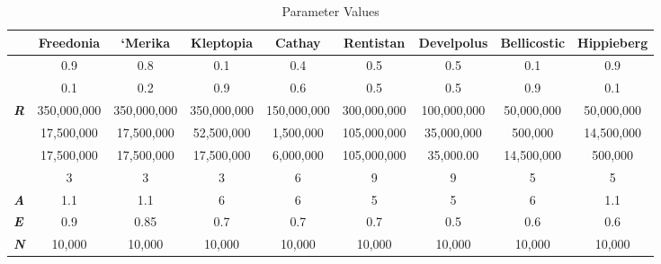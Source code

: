 \documentclass[12pt]{article}
\begin{document}
\begin{spacing}{1.5}

\begin{table}[]
\centering
\begin{tiny}
\caption{Parameter Values}
\begin{tabular}{lcccccccc}
\toprule
                    & \textbf{Freedonia} & \textbf{`Merika} & \textbf{Kleptopia} & \textbf{Cathay} & \textbf{Rentistan} & \textbf{Develpolus} & \textbf{Bellicostic} & \textbf{Hippieberg} \\ \hline
\boldmath{$\alpha$}   & 0.9              & 0.8              & 0.1                & 0.4             & 0.5                & 0.5                 & 0.1                  & 0.9                 \\
\boldmath{$\gamma$}   & 0.1                & 0.2              & 0.9                & 0.6             & 0.5                & 0.5                 & 0.9                  & 0.1                 \\
\textit{\textbf{R}} & 350,000,000        & 350,000,000      & 350,000,000        & 150,000,000     & 300,000,000        & 100,000,000         & 50,000,000           & 50,000,000          \\
\boldmath{$\Phi$}     & 17,500,000         & 17,500,000       & 52,500,000         & 1,500,000       & 105,000,000        & 35,000,000          & 500,000              & 14,500,000          \\
\boldmath{$\Omega$}   & 17,500,000         & 17,500,000       & 17,500,000         & 6,000,000       & 105,000,000        & 35,000.00           & 14,500,000           & 500,000             \\
\boldmath{$\sigma$}   & 3                  & 3                & 3                  & 6               & 9                  & 9                   & 5                    & 5                   \\
\textit{\textbf{A}} & 1.1                & 1.1              & 6                  & 6               & 5                  & 5                   & 6                    & 1.1                 \\
\textit{\textbf{E}} & 0.9                & 0.85             & 0.7                & 0.7             & 0.7                & 0.5                 & 0.6                  & 0.6                 \\
\textit{\textbf{N}} & 10,000             & 10,000           & 10,000             & 10,000          & 10,000             & 10,000              & 10,000               & 10,000 \\ \hline            
\end{tabular}
\end{tiny}
\end{table}


\end{spacing}
\end{document}
